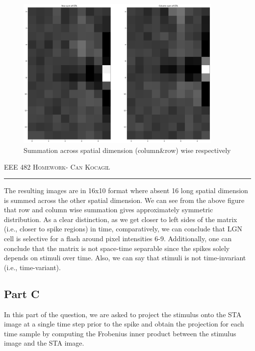 \documentclass[12pt]{amsart}
\begin{document}
\begin{figure}[h]
    \centering
    \includegraphics[width = 0.9\textwidth]{images/SpatialDimensionSummationofSTANew.png}
    \caption{Summation across spatial dimension (column\&row) wise respectively}
\end{figure}



\newpage
{\scshape EEE 482} \hfill {\scshape \large  Homework-\relax} \hfill {\scshape Can Kocagil}
\smallskip
\hrule
\vspace{2mm}

The resulting images are in 16x10 format where absent 16 long spatial dimension is summed across the other spatial dimension. We can see from the above figure that row and column wise summation gives approximately symmetric distribution. As a clear distinction, as we get closer to left sides of the matrix (i.e., closer to spike regions) in time, comparatively, we can conclude that LGN cell is selective for a flash around pixel intensities 6-9. Additionally, one can conclude that the matrix is not space-time separable since the spikes solely depends on stimuli over time. Also, we can say that stimuli is not time-invariant (i.e., time-variant).


\subsection{Part C}

In this part of the question, we are asked to project the stimulus onto the STA image at a single time step prior to the spike and obtain the projection for each time sample by computing the Frobenius inner product between the stimulus image and the STA image.
\end{document}
